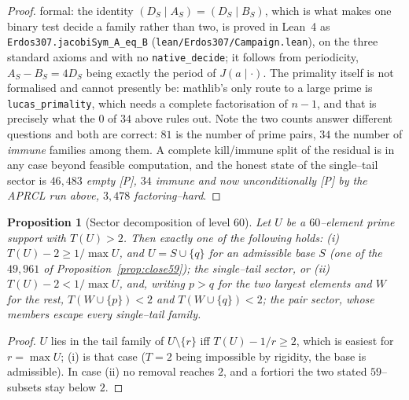 \documentclass[11pt]{article}
\newtheorem{proposition}[theorem]{Proposition}
\theoremstyle{definition}
\begin{document}
\begin{proof}
formal: the identity $(D_S\mid A_S)=(D_S\mid B_S)$, which is what makes one binary test decide a
family rather than two, is proved in Lean~4 as \texttt{Erdos307.jacobiSym\_A\_eq\_B}
\textup{(\texttt{lean/Erdos307/Campaign.lean})}, on the three standard axioms and with no
\texttt{native\_decide}; it follows from periodicity, $A_S-B_S=4D_S$ being exactly the period of
$J(a\mid\cdot)$. The primality itself is not formalised and cannot presently be: mathlib's only
route to a large prime is \texttt{lucas\_primality}, which needs a complete factorisation of
$n-1$, and that is precisely what the $0$ of $34$ above rules out. Note the two counts answer different questions and both are correct: $81$ is the
number of prime pairs, $34$ the number of \emph{immune} families among them. A complete kill/immune split of the residual is in any case beyond feasible
computation, and the honest state of the single--tail sector is \emph{$46{,}483$ empty
\textup{[P]}, $34$ immune and now unconditionally \textup{[P]} by the \textup{APRCL} run above,
$3{,}478$ factoring--hard}.
\end{proof}

\begin{proposition}[Sector decomposition of level $60$]\label{prop:sectors}
Let $U$ be a $60$--element prime support with $T(U)>2$. Then exactly one of the following holds:
\textup{(i)} $T(U)-2\ge 1/\max U$, and $U=S\cup\{q\}$ for an admissible base $S$
\textup{(}one of the $49{,}961$ of Proposition~\ref{prop:close59}\textup{)}; the
\emph{single--tail sector}, or \textup{(ii)} $T(U)-2<1/\max U$, and, writing $p>q$ for the two
largest elements and $W$ for the rest, $T(W\cup\{p\})<2$ and $T(W\cup\{q\})<2$; the
\emph{pair sector}, whose members escape every single--tail family.
\end{proposition}
\begin{proof}
$U$ lies in the tail family of $U\setminus\{r\}$ iff $T(U)-1/r\ge2$, which is easiest for
$r=\max U$; (i) is that case ($T=2$ being impossible by rigidity, the base is admissible). In
case (ii) no removal reaches $2$, and a fortiori the two stated $59$--subsets stay below $2$.
\end{proof}
\end{document}
